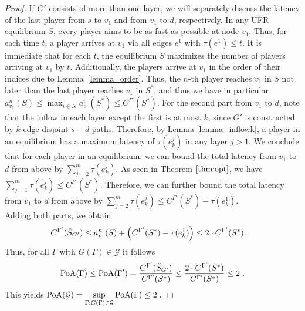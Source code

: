 \begin{proof}
If $G'$ consists of more than one layer, we will separately discuss the latency of the last player from $s$ to $v_1$ and from $v_1$ to $d$, respectively. In any UFR equilibrium $S$, every player aims to be as fast as possible at node $v_1$. Thus, for each time $t$, a player arrives at $v_1$ via all edges $e^1$ with $\tau(e^1) \leq t$. It is immediate that for each $t$, the equilibrium $S$ maximizes the number of players arriving at $v_1$ by $t$. Additionally, the players arrive at $v_1$ in the order of their indices due to Lemma~\ref{lemma_order}. Thus, the $n$-th player reaches $v_1$ in $S$ not later than the last player reaches $v_1$ in $S^*$, and thus we have in particular $a^n_{v_1}(S)\leq \max_{i\in N}a^i_{v_1}(S^*) \leq C^{\Gamma'}(S^*)$. 
For the second part from $v_1$ to $d$, note that the inflow in each layer except the first is at most $k$, since $G'$ is constructed by $k$ edge-disjoint $s-d$ paths.
Therefore, by Lemma \ref{lemma_inflowk}, a player in an equilibrium has a maximum latency of $\tau(e_k^j)$ in any layer $j>1$. We conclude that for each player in an equilibrium, we can bound the total latency from $v_1$ to $d$ from above by $\sum_{j=2}^m \tau(e_k^j)$. 
As seen in Theorem $\ref{thm:opt}$, we have $\sum_{j=1}^m \tau(e_k^j)\leq C^{\Gamma'}(S^*)$. Therefore, we can further bound the total latency from $v_1$ to $d$ from above by $\sum\limits_{j=2}^m \tau(e_k^j)\leq C^{\Gamma'}(S^*)-\tau(e_k^1)$.\\
Adding both parts, we obtain
\begin{align*}
    C^{\Gamma'}(\hat{S}_{G'})&\leq a^n_{v_1}(S) + \left(C^{\Gamma'}(S^*) -\tau(e_k^1)\right) \leq 2 \cdot C^{\Gamma'}(S^*).
\end{align*}
Thus, for all $\Gamma$ with $G(\Gamma) \in \mathcal{G}$ it follows \[\operatorname*{PoA}(\Gamma)\leq \operatorname*{PoA}(\Gamma')=\frac{C^{\Gamma'}(\hat{S}_{G'})}{C^{\Gamma'}(S^*)} \leq \frac{2 \cdot C^{\Gamma'}(S^*)}{C^{\Gamma'}(S^*)} \leq 2\;.\]
This yields $\operatorname*{PoA}(\mathcal{G}) = \sup\limits_{\Gamma: G(\Gamma) \in \mathcal{G}} \operatorname*{PoA}(\Gamma) \leq 2\;.$
\end{proof}
